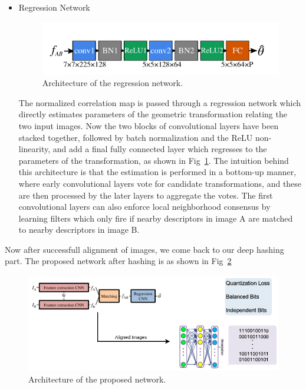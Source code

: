 \documentclass[12pt, a4paper,twoside]{article}
\begin{document}
\begin{itemize}
  \item Regression Network

\begin{figure}[htbp]
\centering
\includegraphics[scale=0.5]{images/regression}
\caption{ Architecture of the regression network.
}\label{fig:figure5}
\end{figure} 
	The normalized correlation map is passed through a regression network which directly estimates parameters of the geometric transformation relating the two input images. Now the two blocks of convolutional layers have been stacked together, followed by batch normalization and the ReLU non-linearity, and add a final fully connected layer which regresses to the parameters of the transformation, as shown in Fig~\ref{fig:figure5}. The intuition behind this architecture is that the estimation is performed in a bottom-up manner, where early convolutional layers vote for candidate transformations, and these are then processed by the later layers to aggregate the votes. The first convolutional layers can also enforce local neighborhood consensus by learning filters which only fire if nearby descriptors in image A are matched to nearby descriptors in image B.

\end{itemize}

	Now after successfull alignment of images, we come back to our deep hashing part. The proposed network after hashing is as shown in Fig~\ref{fig:figure6}
 
\begin{figure}[htbp]
\centering
\includegraphics[scale=0.5]{images/MainNetwork}
\caption{ Architecture of the proposed network.
}\label{fig:figure6}
\end{figure} 
\end{document}
